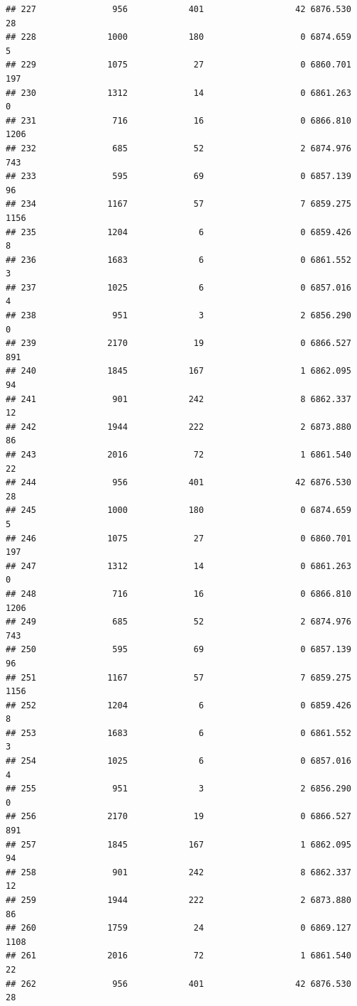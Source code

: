 \documentclass[
]{article}
\begin{document}
\begin{verbatim}
## 227               956            401                  42 6876.530   28
## 228              1000            180                   0 6874.659    5
## 229              1075             27                   0 6860.701  197
## 230              1312             14                   0 6861.263    0
## 231               716             16                   0 6866.810 1206
## 232               685             52                   2 6874.976  743
## 233               595             69                   0 6857.139   96
## 234              1167             57                   7 6859.275 1156
## 235              1204              6                   0 6859.426    8
## 236              1683              6                   0 6861.552    3
## 237              1025              6                   0 6857.016    4
## 238               951              3                   2 6856.290    0
## 239              2170             19                   0 6866.527  891
## 240              1845            167                   1 6862.095   94
## 241               901            242                   8 6862.337   12
## 242              1944            222                   2 6873.880   86
## 243              2016             72                   1 6861.540   22
## 244               956            401                  42 6876.530   28
## 245              1000            180                   0 6874.659    5
## 246              1075             27                   0 6860.701  197
## 247              1312             14                   0 6861.263    0
## 248               716             16                   0 6866.810 1206
## 249               685             52                   2 6874.976  743
## 250               595             69                   0 6857.139   96
## 251              1167             57                   7 6859.275 1156
## 252              1204              6                   0 6859.426    8
## 253              1683              6                   0 6861.552    3
## 254              1025              6                   0 6857.016    4
## 255               951              3                   2 6856.290    0
## 256              2170             19                   0 6866.527  891
## 257              1845            167                   1 6862.095   94
## 258               901            242                   8 6862.337   12
## 259              1944            222                   2 6873.880   86
## 260              1759             24                   0 6869.127 1108
## 261              2016             72                   1 6861.540   22
## 262               956            401                  42 6876.530   28

\end{verbatim}
\end{document}
